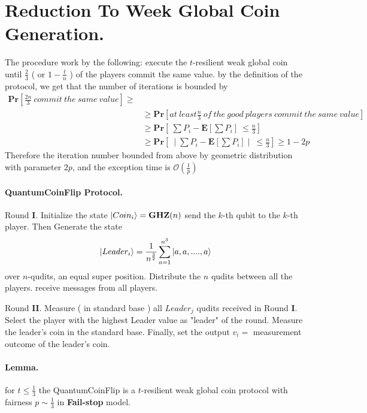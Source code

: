 \section{Reduction To Week Global Coin Generation.}
The procedure work by the following: execute the \(t\)-resilient weak global coin until \( \frac{2}{3} \) ( or \( 1 -  \frac{t}{n} \) ) of the players commit the same value. by the definition of the protocol, we get that the number of iterations is bounded by 
\begin{equation}
\begin{split}
 \mathbf{Pr}\left[ \frac{2n}{3} \ commit \ the \ same \ value \right] \ge \\ &
\ge \mathbf{Pr}\left[ at \ least \frac{n}{3} \ of \ the \ good \ players \ commit \ the \ same \ value \right]  \\ &
\ge \mathbf{Pr}\left[ \ \sum {P_i} - \mathbf{E} \left[\sum{P_i}\right]  \ \le \frac{n}{3} \right] \\ & 
\ge \mathbf{Pr}\left[ \ \mid  \sum {P_i} - \mathbf{E} \left[\sum{P_i}\right] \mid \ \le \frac{n}{3} \right] 
\ge 1-2p  
\end{split}
\end{equation}  Therefore the iteration number bounded from above by geometric  distribution with parameter \( 2p \), and the exception time is \( \mathcal{O} ( \frac{1}{p} ) \)   
\paragraph{QuantumCoinFlip Protocol.} 
Round \( \mathbf{I} \).  Initialize the state \( \ket{Coin_i} = \mathbf{GHZ}(n) \) send the \(k\)-th qubit to the \(k\)-th player. Then Generate the state \[ \ket{Leader_i} = \frac{1}{n^\frac{3}{2}} \sum_{a = 1}^{n^3}{\ket{a,a,....,a}}  \] over \( n \)-qudits, an equal super position. Distribute the \(n\) qudits between all the players. receive messages from all players. 

Round \( \mathbf{II} \). Measure ( in standard base ) all \( Leader_j \) qudits received in Round \( \mathbf{I} \). Select the player with the highest Leader value as "leader" of the round. Measure the leader's coin in the standard base. Finally, set the output \( v_i = \) measurement outcome of the leader's coin.  

\paragraph{Lemma. }for \( t \le \frac{1}{3} \) the QuantumCoinFlip is a \(t\)-resilient weak global coin protocol with fairness \( p \sim \frac{1}{3} \) in \textbf{Fail-stop} model. 
